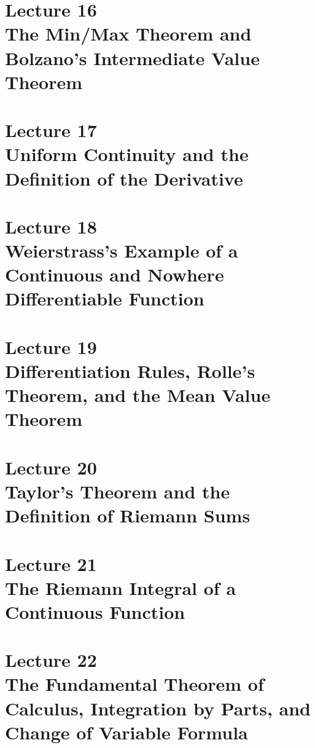 \documentclass{article}
\begin{document}
\section[The Min/Max Theorem and Bolzano's Intermediate Value Theorem]{Lecture 16 \\ {\normalsize The Min/Max Theorem and Bolzano's Intermediate Value Theorem}} \newpage 
\section[Uniform Continuity and the Definition of the Derivative]{Lecture 17 \\ {\normalsize Uniform Continuity and the Definition of the Derivative}} \newpage 
\section[Weierstrass's Example of a Continuous and Nowhere Differentiable Function]{Lecture 18 \\ {\normalsize 	Weierstrass's Example of a Continuous and Nowhere Differentiable Function}} \newpage 
\section[Differentiation Rules, Rolle's Theorem, and the Mean Value Theorem]{Lecture 19 \\ {\normalsize Differentiation Rules, Rolle's Theorem, and the Mean Value Theorem}} \newpage 
\section[Taylor's Theorem and the Definition of Riemann Sums]{Lecture 20 \\ {\normalsize Taylor's Theorem and the Definition of Riemann Sums}} \newpage 
\section[The Riemann Integral of a Continuous Function]{Lecture 21 \\ {\normalsize The Riemann Integral of a Continuous Function}} \newpage 
\section[The Fundamental Theorem of Calculus, Integration by Parts, and Change of Variable Formula]{Lecture 22 \\ {\normalsize The Fundamental Theorem of Calculus, Integration by Parts, and Change of Variable Formula}} \newpage 
\end{document}

